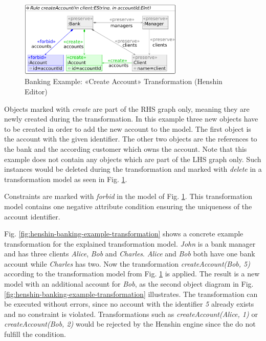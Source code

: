 \documentclass[runningheads]{llncs}
\begin{document}
\begin{figure}[H]
	\centering
	\includegraphics[width=0.70\textwidth]{createAccountTransformation}
	\caption{Banking Example: «Create Account» Transformation \cite{henshin-banking-example} (Henshin Editor)}
	\label{fig:henshin-banking-example-transformation-model}
\end{figure}

\noindent
Objects marked with \textit{create} are part of the RHS graph only, meaning they are newly created during the transformation. In this example three new objects have to be created in order to add the new account to the model. The first object is the account with the given identifier. The other two objects are the references to the bank and the according customer which owns the account. Note that this example does not contain any objects which are part of the LHS graph only. Such instances would be deleted during the transformation and marked with \textit{delete} in a transformation model as seen in Fig. \ref{fig:henshin-banking-example-transformation-model}.

Constraints are marked with \textit{forbid} in the model of Fig. \ref{fig:henshin-banking-example-transformation-model}. This transformation model contains one negative attribute condition ensuring the uniqueness of the account identifier. 

Fig. \ref{fig:henshin-banking-example-transformation} shows a concrete example transformation for the explained transformation model. \textit{John} is a bank manager and has three clients \textit{Alice}, \textit{Bob} and \textit{Charles}. \textit{Alice} and \textit{Bob} both have one bank account while \textit{Charles} has two. Now the transformation \textit{createAccount(Bob, 5)} according to the transformation model from Fig. \ref{fig:henshin-banking-example-transformation-model} is applied. The result is a new model with an additional account for \textit{Bob}, as the second object diagram in Fig. \ref{fig:henshin-banking-example-transformation} illustrates. The transformation can be executed without errors, since no account with the identifier \textit{5} already exists and no constraint is violated. Transformations such as \textit{createAccount(Alice, 1)} or \textit{createAccount(Bob, 2)} would be rejected by the Henshin engine since the do not fulfill the condition.
\end{document}
